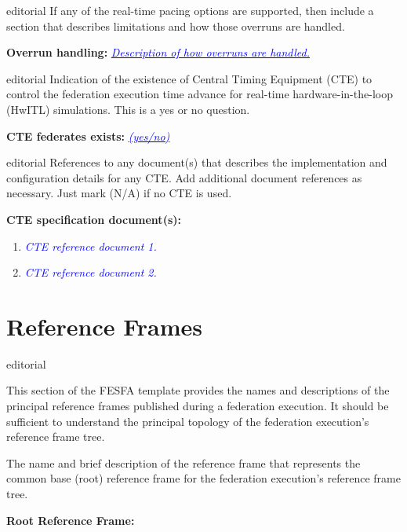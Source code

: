 \documentclass[11pt,english,letterpaper]{article}
\newcommand{\example}[1]{{\textcolor{blue}{\textit{#1}}}}
\begin{document}
\begin{shownto}{editorial}
{\color{red} If any of the real-time pacing options are supported, then include
a section that describes limitations and how those overruns are handled.}
\end{shownto}

\textbf{Overrun handling: } \underline{\example{Description of how overruns
are handled.}}

\begin{shownto}{editorial}
{\color{red} Indication of the existence of Central Timing Equipment (CTE) to
control the federation execution time advance for real-time hardware-in-the-loop
(HwITL) simulations. This is a yes or no question.}
\end{shownto}

\textbf{CTE federates exists: } \underline{\example{(yes/no)}}

\begin{shownto}{editorial}
{\color{red} References to any document(s) that describes the implementation
and configuration details for any CTE. Add additional document references as
necessary. Just mark (N/A) if no CTE is used.}
\end{shownto}

\textbf{CTE specification document(s): }
\begin{enumerate}
\item \example{CTE reference document 1.}
\item \example{CTE reference document 2.}
\end{enumerate}


\section*{Reference Frames}

\begin{shownto}{editorial}
{\color{red} This section of the FESFA template provides the names and
descriptions of the principal reference frames published during a federation
execution. It should be sufficient to understand the principal topology of the
federation execution’s reference frame tree.

The name and brief description of the reference frame that represents the
common base (root) reference frame for the federation execution’s reference
frame tree.}
\end{shownto}

\textbf{Root Reference Frame: }
\end{document}
